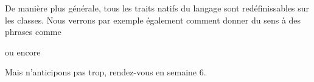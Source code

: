 De manière plus générale, tous les traits natifs du langage sont
redéfinissables sur les classes. Nous verrons par exemple également
comment donner du sens à des phrases comme

\begin{Shaded}
\begin{Highlighting}[frame=lines,framerule=0.6mm,rulecolor=\color{asisframecolor}]
\OperatorTok{=}
    \OperatorTok{<}\OperatorTok{>}
\end{Highlighting}
\end{Shaded}

ou encore

\begin{Shaded}
\begin{Highlighting}[frame=lines,framerule=0.6mm,rulecolor=\color{asisframecolor}]
\OperatorTok{=}
    \OperatorTok{<}\OperatorTok{>}
\end{Highlighting}
\end{Shaded}

Mais n'anticipons pas trop, rendez-vous en semaine 6.


    
    
    
